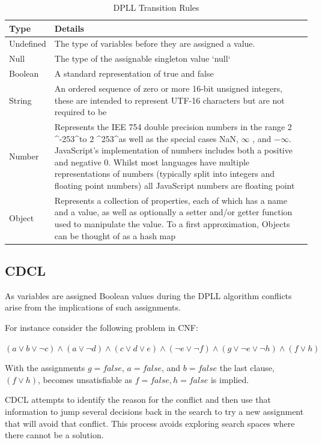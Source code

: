 \documentclass[]{final_report}
\begin{document}
\begin{table}[]
\centering
\caption{DPLL Transition Rules}
\label{dpll-rules}
\begin{tabular}{|l|l|}
\hline
Type & Details \\ \hline
Undefined & The type of variables before they are assigned a value. \\ \hline
Null & The type of the assignable singleton value `null` \\ \hline
Boolean & A standard representation of true and false \\ \hline
String & An ordered sequence of zero or more 16-bit unsigned integers, these are intended to represent UTF-16 characters but are not required to be \\ \hline
Number & Represents the IEE 754 double precision numbers in the range 2 \textasciicircum -253\textasciicircum  to 2 \textasciicircum 253\textasciicircum  as well as the special cases NaN, $\infty$ , and $ -\infty$. JavaScript's implementation of numbers includes both a positive and negative 0. Whilst most languages have multiple representations of numbers (typically split into integers and floating point numbers) all JavaScript numbers are floating point \\ \hline
Object & Represents a collection of properties, each of which has a name and a value, as well as optionally a setter and/or getter function used to manipulate the value. To a first approximation, Objects can be thought of as a hash map \\ \hline
\end{tabular}
\end{table}

\subsection{CDCL}
As variables are assigned Boolean values during the DPLL algorithm conflicts arise from the implications of such assignments.

For instance consider the following problem in CNF:

$(a \lor b \lor \lnot c) \land (a \lor \lnot d) \land (c \lor d \lor e) \land (\lnot e \lor \lnot f ) \land (g \lor \lnot e \lor \lnot h) \land (f \lor h)$

With the assignments $g = false$, $a = false$, and $b = false$ the last clause, $ (f \lor h) $,  becomes unsatisfiable as $ f = false, h = false$ is implied.

CDCL attempts to identify the reason for the conflict and then use that information to jump several decisions back in the search to try a new assignment that will avoid that conflict. This process avoids exploring search spaces where there cannot be a solution. 
\end{document}
